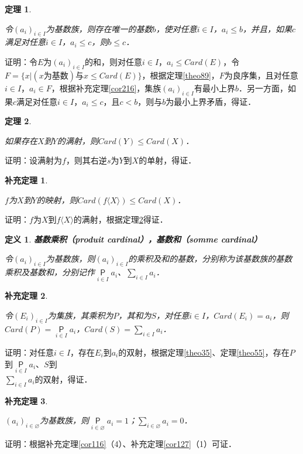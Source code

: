 \documentclass[12pt, a4paper, oneside]{book}
\newtheorem{theo}{定理}
\newtheorem{cor}{补充定理}
\newtheorem{de}{定义}
\begin{document}
			\begin{theo}\label{theo92}
				\hfill\par
				令$(a_i)_{i\in I}$为基数族，则存在唯一的基数$b$，使对任意$i\in I$，$a_i\leq b$，并且，如果$c$满足对任意$i\in I$，$a_i\leq c$，则$b\leq c$．
			\end{theo}
			证明：令$E$为$(a_i)_{i\in I}$的和，则对任意$i\in I$，$a_i\leq Card(E)$，令$F=\{x|(x\text{为基数})\text{与}x\leq Card(E)\}$，根据定理\ref{theo89}，$F$为良序集，且对任意$i\in I$，$a_i\in F$，根据补充定理\ref{cor216}，集族$(a_i)_{i\in I}$有最小上界$b$．另一方面，如果$c$满足对任意$i\in I$，$a_i\leq c$，且$c<b$，则与$b$为最小上界矛盾，得证．
			
			\begin{theo}\label{theo93}
				\hfill\par
				如果存在$X$到$Y$的满射，则$Card(Y)\leq Card(X)$．
			\end{theo}
			证明：设满射为$f$，则其右逆$s$为$Y$到$X$的单射，得证．
			
			\begin{cor}\label{cor294}
				\hfill\par
				$f$为$X$到$Y$的映射，则$Card(f\langle X\rangle)\leq Card(X)$．
			\end{cor}
			证明：$f$为$X$到$f\langle X\rangle$的满射，根据定理\ref{theo93}得证．
						
			\begin{de}
				\textbf{基数乘积（produit cardinal），基数和（somme cardinal）}
				\par
				令$(a_i)_{i\in I}$为基数族，则$(a_i)_{i\in I}$的乘积及和的基数，分别称为该基数族的基数乘积及基数和，分别记作$\mathop{\mathsf{P}}\limits_{i\in I}a_i$、$\sum\limits_{i\in I}a_i$．
			\end{de}
			
			\begin{cor}\label{cor295}
				\hfill\par
				令$(E_i)_{i\in I}$为集族，其乘积为$P$，其和为$S$，对任意$i\in I$，$Card(E_i)=a_i$，则$Card(P)=\mathop{\mathsf{P}}\limits_{i\in I}a_i$，$Card(S)=\sum\limits_{i\in I}a_i$．
			\end{cor}
			证明：对任意$i\in I$，存在$E_i$到$a_i$的双射，根据定理\ref{theo35}、定理\ref{theo55}，存在$P$到$\mathop{\mathsf{P}}\limits_{i\in I}a_i$、$S$到\\$\sum\limits_{i\in I}a_i$的双射，得证．
						
			\begin{cor}\label{cor296}
				\hfill\par
				$(a_i)_{i \in \varnothing}$为基数族，则$\mathop{\mathsf{P}}\limits_{i\in \varnothing}a_i=1$；$\sum\limits_{i\in \varnothing}a_i=0$．
			\end{cor}
			证明：根据补充定理\ref{cor116}（4）、补充定理\ref{cor127}（1）可证．
									
\end{document}
